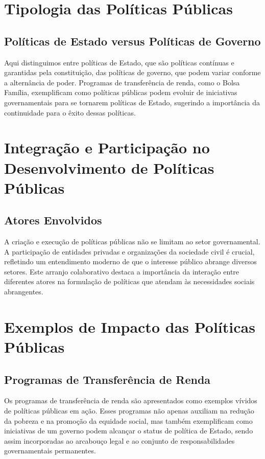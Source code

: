 \documentclass[
   article,       
   12pt,          
   oneside,       
   a4paper,       
   english,       
   brazil,        
   sumario=tradicional
   ]{abntex2}
\begin{document}
\section{Tipologia das Políticas Públicas}
    \subsection{Políticas de Estado versus Políticas de Governo}
        Aqui distinguimos entre políticas de Estado, que são políticas contínuas e garantidas pela constituição, das políticas de governo, que podem variar conforme a alternância de poder. Programas de transferência de renda, como o Bolsa Família, exemplificam como políticas públicas podem evoluir de iniciativas governamentais para se tornarem políticas de Estado, sugerindo a importância da continuidade para o êxito dessas políticas.

\section{Integração e Participação no Desenvolvimento de Políticas Públicas}
    \subsection{Atores Envolvidos}
        A criação e execução de políticas públicas não se limitam ao setor governamental. A participação de entidades privadas e organizações da sociedade civil é crucial, refletindo um entendimento moderno de que o interesse público abrange diversos setores. Este arranjo colaborativo destaca a importância da interação entre diferentes atores na formulação de políticas que atendam às necessidades sociais abrangentes.

\section{Exemplos de Impacto das Políticas Públicas}
    \subsection{Programas de Transferência de Renda}
        Os programas de transferência de renda são apresentados como exemplos vívidos de políticas públicas em ação. Esses programas não apenas auxiliam na redução da pobreza e na promoção da equidade social, mas também exemplificam como iniciativas de um governo podem alcançar o status de política de Estado, sendo assim incorporadas ao arcabouço legal e ao conjunto de responsabilidades governamentais permanentes.
\end{document}
